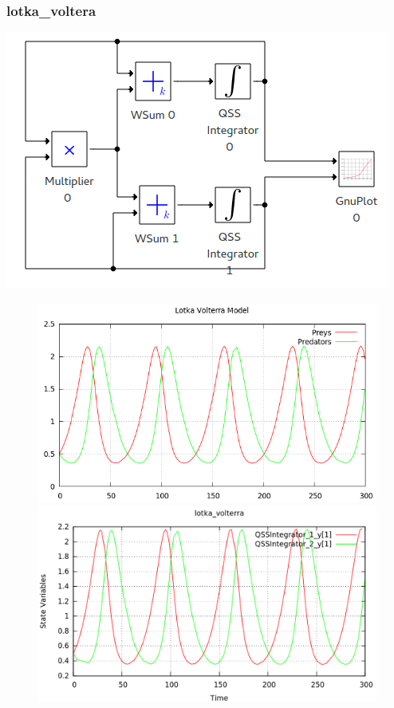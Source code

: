 \documentclass[a4paper,	11pt]{report}
\begin{document}
\subsubsection{lotka\_voltera}

 \includegraphics[width=0.75\linewidth]{lotka_voltera_pwd}

\begin{figure}[H]
\centering
\begin{minipage}{0.5\textwidth}
\centering
 \includegraphics[width=\linewidth]{lotka_voltera-pd}
\end{minipage}\hfill
\begin{minipage}{0.5\textwidth}
\centering
 \includegraphics[width=\linewidth]{lotka_voltera-qss}
\end{minipage}
\end{figure}
\end{document}
